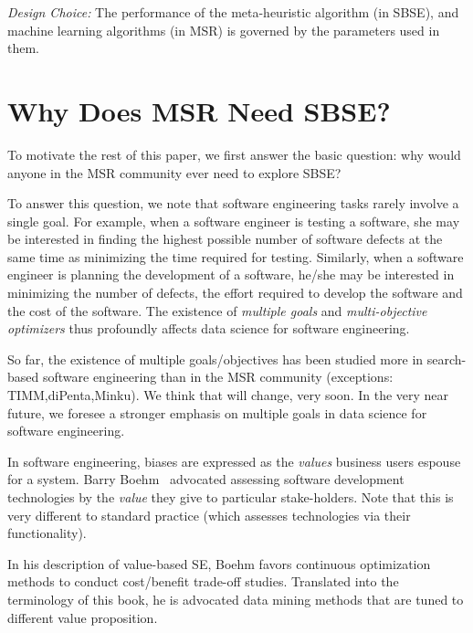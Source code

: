 \documentclass[table, xcdraw, sigconf,review, anonymous]{acmart}
\begin{document}
\noindent\textit{Design Choice:} The performance of the meta-heuristic algorithm (in SBSE), and machine learning algorithms (in MSR) is governed by the parameters used in them. 

\section{Why Does MSR Need SBSE?}

To motivate the rest of this paper, we first answer the basic question: why would anyone in the MSR
community ever need to explore SBSE?

 To answer this question, we note that
 software engineering tasks rarely involve a
single goal. For example, when a software engineer
is testing a software, she may be interested in
finding the highest possible number of software
defects at the same time as minimizing the time
required for testing. Similarly, when a software
engineer is planning the development of a software,
he/she may be interested in minimizing the number of
defects, the effort required to develop the software
and the cost of the software. The existence of {\em
multiple goals} and {\em multi-objective optimizers}
thus profoundly affects data science for software
engineering.

So far, the existence of multiple goals/objectives
has been studied more in search-based software
engineering than in the MSR community (exceptions: TIMM,diPenta,Minku). We think that will change, very
soon. In the very near future, we foresee a stronger
emphasis on multiple goals in data science for
software engineering.

In software engineering, biases are expressed as the {\em values}
business users espouse for a system.
 Barry Boehm~\cite{boehm04}
advocated assessing
software development technologies
 by the {\em value} they give
to particular stake-holders. Note that this is
very different to standard practice (which assesses technologies
via their functionality).

In his description of value-based SE, Boehm favors
continuous optimization methods to  conduct cost/benefit
trade-off studies. Translated into the terminology
of this book, he is advocated data mining methods that are
tuned to different value proposition.
\end{document}
